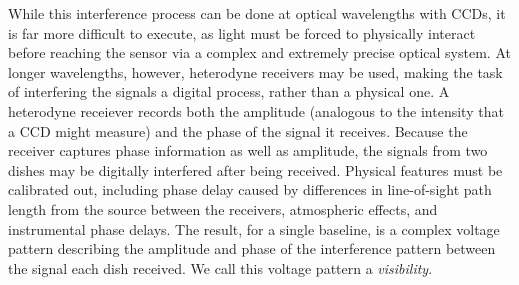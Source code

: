 




While this interference process can be done at optical wavelengths with CCDs, it is far more difficult to execute, as light must be forced to physically interact before reaching the sensor via a complex and extremely precise optical system. At longer wavelengths, however, heterodyne receivers may be used, making the task of interfering the signals a digital process, rather than a physical one. A heterodyne receiever records both the amplitude (analogous to the intensity that a CCD might measure) and the phase of the signal it receives. Because the receiver captures phase information as well as amplitude, the signals from two dishes may be digitally interfered after being received. Physical features must be calibrated out, including phase delay caused by differences in line-of-sight path length from the source between the receivers, atmospheric effects, and instrumental phase delays. The result, for a single baseline, is a complex voltage pattern describing the amplitude and phase of the interference pattern between the signal each dish received. We call this voltage pattern a \textit{visibility}.


